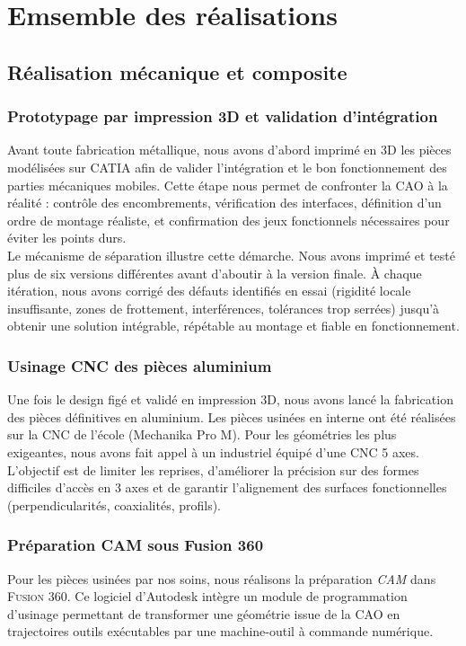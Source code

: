 \section{Emsemble des réalisations}
\label{sec:realisation}

\subsection{Réalisation mécanique et composite}

\subsubsection{Prototypage par impression 3D et validation d’intégration}
Avant toute fabrication métallique, nous avons d’abord imprimé en 3D les pièces modélisées sur \textsc{\acrshort{CATIA}} afin de
valider l’intégration et le bon fonctionnement des parties mécaniques mobiles. Cette étape nous permet de confronter la
\acrshort{CAO} à la réalité : contrôle des encombrements, vérification des interfaces, définition d’un ordre de montage
réaliste, et confirmation des jeux fonctionnels nécessaires pour éviter les points durs.\\

Le mécanisme de séparation illustre cette démarche. Nous avons imprimé et testé plus de six versions différentes avant d’aboutir
à la version finale. À chaque itération, nous avons corrigé des défauts identifiés en essai (rigidité locale insuffisante, zones
de frottement, interférences, tolérances trop serrées) jusqu’à obtenir une solution intégrable, répétable au montage et fiable en
fonctionnement.

\subsubsection{Usinage \acrshort{CNC} des pièces aluminium}

Une fois le design figé et validé en impression 3D, nous avons lancé la fabrication des pièces définitives en aluminium. Les
pièces usinées en interne ont été réalisées sur la \acrshort{CNC} de l’école (Mechanika Pro M). Pour les géométries les plus
exigeantes, nous avons fait appel à un industriel équipé d’une \acrshort{CNC} 5 axes. L’objectif est de limiter les reprises,
d’améliorer la précision sur des formes difficiles d’accès en 3 axes et de garantir l’alignement des surfaces fonctionnelles
(perpendicularités, coaxialités, profils).

\subsubsection{Préparation \acrshort{CAM} sous Fusion 360}
Pour les pièces usinées par nos soins, nous réalisons la préparation \textit{\acrfull{CAM}} dans \textsc{Fusion 360}. Ce logiciel
d’Autodesk intègre un module de programmation d’usinage permettant de transformer une géométrie issue de la CAO en trajectoires
outils exécutables par une machine-outil à commande numérique.\\


